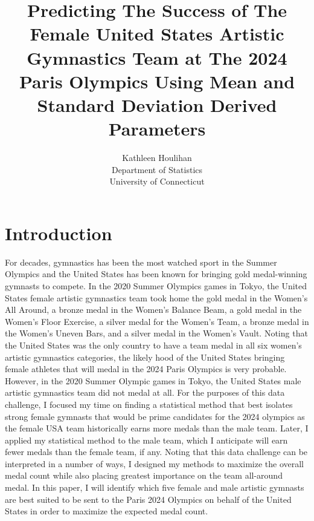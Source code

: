 \documentclass[12pt]{article}
\title{Predicting The Success of The Female United States Artistic Gymnastics Team at The 2024 Paris Olympics 
Using Mean and Standard Deviation Derived Parameters}
\author{Kathleen Houlihan\\
  Department of Statistics\\
  University of Connecticut
}
\begin{document}
\maketitle

\begin{abstract}
    

\end{abstract}

\section{Introduction}
\label{sec:intro}

For decades, gymnastics has been the most watched sport in the Summer Olympics and the United States 
has been known for bringing gold medal-winning gymnasts to compete. In the 2020 
Summer Olympics games in Tokyo, the United States female artistic gymnastics team took home 
the gold medal in the Women's All Around, a bronze medal in the Women's Balance 
Beam, a gold medal in the Women's Floor Exercise, a silver medal for the Women's
Team, a bronze medal in the Women's Uneven Bars, and a silver medal in the Women's Vault. 
Noting that the United States was the only country to have a team medal in all six women's artistic gymnastics 
categories, the likely hood of the United States bringing female athletes that will medal in the 2024 
Paris Olympics is very probable. However, in the 2020 Summer Olympic games in Tokyo, the United States 
male artistic gymnastics team did not medal at all. For the purposes of this data challenge, I focused my 
time on finding a statistical method that best isolates strong female gymnasts that would be prime candidates 
for the 2024 olympics as the female USA team historically earns more medals than the male team. Later, I applied 
my statistical method to the male team, which I anticipate will earn fewer medals than the female team, if any. 
Noting that this data challenge can be interpreted in a number of ways, I designed my methods to maximize the 
overall medal count while also placing greatest importance on the team all-around medal. In this paper, I will 
identify which five female and male artistic gymnasts are best suited to be sent to the Paris 2024 
Olympics on behalf of the United States in order to maximize the expected medal count. 
\end{document}
